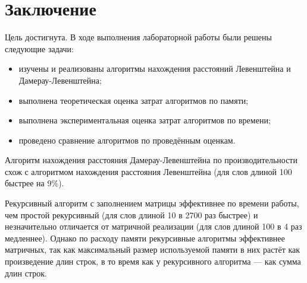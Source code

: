 \chapter*{Заключение}

Цель достигнута. В ходе выполнения лабораторной работы были решены следующие задачи:

\begin{itemize}
    \item изучены и реализованы алгоритмы нахождения расстояний Левенштейна и Дамерау-Левенштейна;
	\item выполнена теоретическая оценка затрат алгоритмов по памяти;
	\item выполнена экспериментальная оценка затрат алгоритмов по времени;
	\item проведено сравнение алгоритмов по проведённым оценкам.
\end{itemize}

Алгоритм нахождения расстояния Дамерау-Левенштейна по производительности схож с алгоритмом нахождения расстояния Левенштейна (для слов длиной 100 быстрее на 9\%).

Рекурсивный алгоритм с заполнением матрицы эффективнее по времени работы, чем простой рекурсивный (для слов длиной 10 в 2700 раз быстрее) и незначительно отличается от матричной реализации (для слов длиной 100 в 4 раз медленнее). Однако по расходу памяти рекурсивные алгоритмы эффективнее матричных, так как максимальный размер используемой памяти в них растёт как произведение длин строк, в то время как у рекурсивного алгоритма --- как сумма длин строк.


